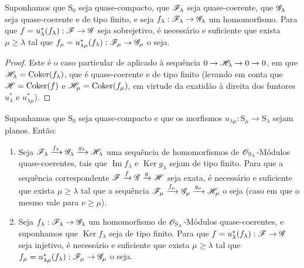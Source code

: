 \begin{corollary}[8.5.7]
\label{IV.8.5.7}
Suponhamos que $\mathrm{S}_0$ seja quase-compacto, que $\mathscr{F}_\lambda$ seja quase-coerente, que $\mathscr{G}_\lambda$ seja quase-coerente e de tipo finito, e seja $f_\lambda:\sh{F}_\lambda\to\sh{G}_\lambda$ um homomorfismo.
Para que $f=u_\lambda^*(f_\lambda):\sh{F}\to\sh{G}$ seja sobrejetivo, é necessário e suficiente que exista $\mu\geqslant\lambda$ tal que $f_\mu=u_{\lambda\mu}^*(f_\lambda):\sh{F}_\mu\to\sh{G}_\mu$ o seja.
\end{corollary}

\begin{proof}
Este é o caso particular de  aplicado à sequência $0\to\sh{H}_\lambda\to 0\to 0$, em que $\mathscr{H}_\lambda=\operatorname{Coker}(f_\lambda)$, que é quase-coerente e de tipo finito (levando em conta que $\mathscr{H}=\operatorname{Coker}(f)$ e $\mathscr{H}_\mu=\operatorname{Coker}(f_\mu)$, em virtude da exatidão à direita dos funtores $u_\lambda^*$ e $u_{\lambda\mu}^*$).
\end{proof}

\begin{corollary}[8.5.8]
\label{IV.8.5.8}
Suponhamos que $\mathrm{S}_0$ seja quase-compacto e que os morfismos $u_{\lambda\mu}:\mathrm{S}_\mu\to\mathrm{S}_\lambda$ sejam planos.
Então:
\begin{enumerate}[label=(\roman*)]
  \item Seja $\mathscr{F}_\lambda\xrightarrow{f_\lambda}\mathscr{G}_\lambda\xrightarrow{g_\lambda}\mathscr{H}_\lambda$ uma sequência de homomorfismos de $\mathscr{O}_{\mathrm{S}_\lambda}$-Módulos quase-coerentes, tais que $\operatorname{Im} f_\lambda$ e $\operatorname{Ker} g_\lambda$ sejam de tipo finito.
Para que a sequência correspondente $\mathscr{F}\xrightarrow{f}\mathscr{G}\xrightarrow{g}\mathscr{H}$ seja
exata, é necessário e suficiente que exista $\mu\geqslant\lambda$ tal que a sequência $\mathscr{F}_\mu\xrightarrow{f_\mu}\mathscr{G}_\mu\xrightarrow{g_\mu}\mathscr{H}_\mu$ o seja (caso em que o mesmo vale para $\nu\geqslant\mu$).
  \item Seja $f_\lambda:\sh{F}_\lambda\to\sh{G}_\lambda$ um homomorfismo de $\mathscr{O}_{\mathrm{S}_\lambda}$-Módulos quase-coerentes, e suponhamos que $\operatorname{Ker} f_\lambda$ seja de tipo finito.
Para que $f=u_\lambda^*(f_\lambda):\sh{F}\to\sh{G}$ seja injetivo, é necessário e suficiente que exista $\mu\geqslant\lambda$ tal que $f_\mu=u_{\lambda\mu}^*(f_\lambda):\sh{F}_\mu\to\sh{G}_\mu$ o seja.
\end{enumerate}
\end{corollary}

